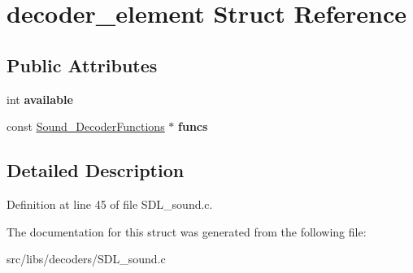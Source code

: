 \hypertarget{structdecoder__element}{\section{decoder\-\_\-element Struct Reference}
\label{structdecoder__element}
}
\subsection*{Public Attributes}
\begin{DoxyCompactItemize}
\item 
\hypertarget{structdecoder__element_af9e5b8ff12a4e7547f3a5434a62c74ee}{int {\bfseries available}}\label{structdecoder__element_af9e5b8ff12a4e7547f3a5434a62c74ee}

\item 
\hypertarget{structdecoder__element_af00c836414193f2c08f29546aa7f0122}{const \hyperlink{struct____SOUND__DECODERFUNCTIONS____}{Sound\-\_\-\-Decoder\-Functions} $\ast$ {\bfseries funcs}}\label{structdecoder__element_af00c836414193f2c08f29546aa7f0122}

\end{DoxyCompactItemize}


\subsection{Detailed Description}


Definition at line 45 of file S\-D\-L\-\_\-sound.\-c.



The documentation for this struct was generated from the following file\-:\begin{DoxyCompactItemize}
\item 
src/libs/decoders/S\-D\-L\-\_\-sound.\-c\end{DoxyCompactItemize}
